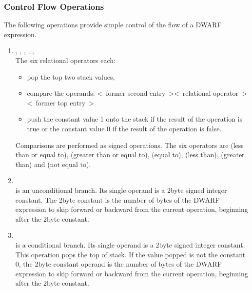 \subsubsection{Control Flow Operations}
\label{chap:controlflowoperations}
The 
following operations provide simple control of the flow of a DWARF expression.
\begin{enumerate}[1]
\item  {}, , , , ,  \\
The six relational operators each:
\begin{itemize}
\item pop the top two stack values,

\item compare the operands:
\textless~former second entry~\textgreater  \textless~relational operator~\textgreater \textless~former top entry~\textgreater

\item push the constant value 1 onto the stack 
if the result of the operation is true or the
constant value 0 if the result of the operation is false.
\end{itemize}

Comparisons are performed as signed operations. The six
operators are  (less than or equal to), 
(greater than or equal to),  (equal to),  (less
than),  (greater than) and  (not equal to).

\item {} \\
 is an unconditional branch. Its single operand
is a 2\dash byte signed integer constant. The 2\dash byte constant is
the number of bytes of the DWARF expression to skip forward
or backward from the current operation, beginning after the
2\dash byte constant.

\item {} \\
 is a conditional branch. Its single operand is a
2\dash byte signed integer constant.  This operation pops the
top of stack. If the value popped is not the constant 0,
the 2\dash byte constant operand is the number of bytes of the
DWARF expression to skip forward or backward from the current
operation, beginning after the 2\dash byte constant.


\end{enumerate}
